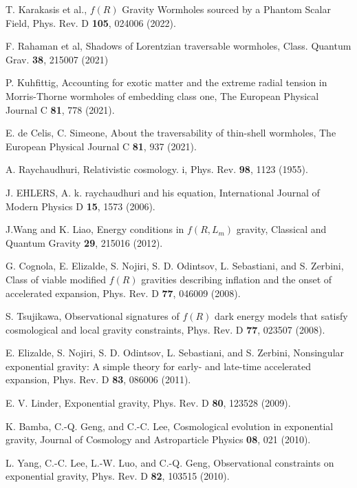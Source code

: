 \begin{thebibliography}{87}
T. Karakasis et al., $f(R)$ Gravity Wormholes sourced by a Phantom Scalar Field, Phys. Rev. D \textbf{105}, 024006 (2022).

F. Rahaman et al, Shadows of Lorentzian traversable wormholes, Class. Quantum Grav. \textbf{38}, 215007 (2021)

P. Kuhfittig, Accounting for exotic matter and the extreme radial tension in Morris-Thorne wormholes of embedding class one, The European Physical Journal C \textbf{81}, 778 (2021).

E. de Celis, C. Simeone, About the traversability of thin-shell wormholes, The European Physical Journal C \textbf{81}, 937 (2021).











 A. Raychaudhuri, Relativistic cosmology. i, Phys. Rev. \textbf{98}, 1123 (1955).

 J. EHLERS, A. k. raychaudhuri and his equation, International Journal of Modern Physics D \textbf{15}, 1573 (2006).

 J.Wang and K. Liao, Energy conditions in $f(R,L_m)$ gravity, Classical and Quantum Gravity \textbf{29}, 215016 (2012).

 G. Cognola, E. Elizalde, S. Nojiri, S. D. Odintsov, L. Sebastiani, and S. Zerbini, Class of viable modified $f(R)$ gravities describing
inflation and the onset of accelerated expansion, Phys. Rev. D \textbf{77}, 046009 (2008).

 S. Tsujikawa, Observational signatures of $f(R)$ dark energy models that satisfy cosmological and local gravity constraints,
Phys. Rev. D \textbf{77}, 023507 (2008).

 E. Elizalde, S. Nojiri, S. D. Odintsov, L. Sebastiani, and S. Zerbini, Nonsingular exponential gravity: A simple theory for
early- and late-time accelerated expansion, Phys. Rev. D \textbf{83}, 086006 (2011).

 E. V. Linder, Exponential gravity, Phys. Rev. D \textbf{80}, 123528 (2009).

K. Bamba, C.-Q. Geng, and C.-C. Lee, Cosmological evolution in exponential gravity, Journal of Cosmology and Astroparticle
Physics \textbf{08}, 021  (2010).

 L. Yang, C.-C. Lee, L.-W. Luo, and C.-Q. Geng, Observational constraints on exponential gravity, Phys. Rev. D \textbf{82}, 103515
(2010).


\end{thebibliography}
